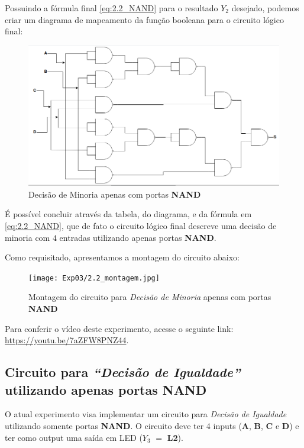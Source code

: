 \documentclass[12pt]{article}
\begin{document}
Possuindo a fórmula final \ref{eq:2.2_NAND} para o resultado \(Y_{2}\) desejado,
podemos criar um diagrama de mapeamento da função booleana para o circuito
lógico final:

\begin{figure}[H]
    \centering
    \includegraphics[width=.9\textwidth]{Exp03/2.2.png}
    \caption{Decisão de Minoria apenas com portas \textbf{NAND}}
    \label{fig:decisao_minoria}
\end{figure}

É possível concluir através da tabela, do diagrama, e da fórmula em
\ref{eq:2.2_NAND}, que de fato o circuito lógico final descreve uma decisão de
minoria com \(4\) entradas utilizando apenas portas \textbf{NAND}.

Como requisitado, apresentamos a montagem do circuito abaixo:

\begin{figure}[H]
    \centering
    \texttt{[image: Exp03/2.2\_montagem.jpg]}
    \caption{Montagem do circuito para \textit{Decisão de Minoria} apenas com portas \textbf{NAND}}
    \label{fig:decisao_minoria_montagem}
\end{figure}

Para conferir o vídeo deste experimento, acesse o seguinte link:
\href{https://youtu.be/7aZFW8PNZ44}{https://youtu.be/7aZFW8PNZ44}.
\\[2em]

\subsection{Circuito para \textit{``Decisão de Igualdade''} utilizando apenas portas \textbf{NAND}}\label{sec:decisao_igualdade}

O atual experimento visa implementar um circuito para \textit{Decisão de
Igualdade} utilizando somente portas \textbf{NAND}. O circuito deve ter 4 inputs
(\textbf{A}, \textbf{B}, \textbf{C} e \textbf{D}) e ter como output uma saída em
LED (\(Y_{3}\) \( = \) \textbf{L2}).
\end{document}
